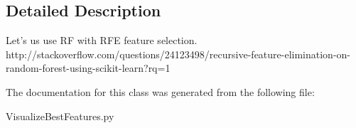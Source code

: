 \subsection{Detailed Description}
\begin{DoxyVerb}Let's us use RF with RFE feature selection.
http://stackoverflow.com/questions/24123498/recursive-feature-elimination-on-random-forest-using-scikit-learn?rq=1
\end{DoxyVerb}
 

The documentation for this class was generated from the following file\+:\begin{DoxyCompactItemize}
\item 
Visualize\+Best\+Features.\+py\end{DoxyCompactItemize}
